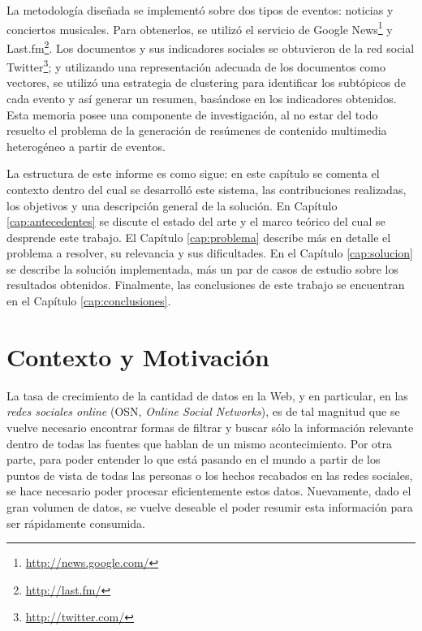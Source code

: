   La metodología diseñada se implementó sobre dos tipos de eventos:
  noticias y conciertos musicales. Para obtenerlos, se utilizó
  el servicio de Google News\footnote{\href{http://news.google.com/}{http://news.google.com/} } y
  Last.fm\footnote{\href{http://last.fm/}{http://last.fm/} }. Los documentos y sus indicadores
  sociales se obtuvieron de la red social
  Twitter\footnote{\href{http://twitter.com/}{http://twitter.com/} }; y utilizando una representación
  adecuada de los documentos como vectores, se utilizó una estrategia
  de clustering para identificar los subtópicos de cada evento y así
  generar un resumen, basándose en los indicadores obtenidos. Esta memoria posee una 
  componente de investigación, al no estar del todo resuelto el problema 
  de la generación de resúmenes de contenido multimedia heterogéneo a partir de eventos.

  La estructura de este informe es como sigue: en este capítulo se
  comenta el contexto dentro del cual se desarrolló este sistema, las
  contribuciones realizadas, los objetivos y una descripción general
  de la solución. En Capítulo \ref{cap:antecedentes} se discute el estado del
  arte y el marco teórico del cual se desprende este trabajo. El
  Capítulo \ref{cap:problema} describe más en detalle el problema a resolver, su
  relevancia y sus dificultades. En el
  Capítulo \ref{cap:solucion} se describe la solución implementada, más
  un par de casos de estudio sobre los resultados obtenidos. Finalmente, las conclusiones 
  de este trabajo se encuentran en el Capítulo \ref{cap:conclusiones}.

\section{Contexto y Motivación}
\label{sec-1.1}


   La tasa de crecimiento de la cantidad de datos en la Web, y en
   particular, en las \emph{redes sociales online} (OSN, \emph{Online Social Networks}),
   es de tal magnitud que se vuelve necesario encontrar formas de
   filtrar y buscar sólo la información relevante dentro de todas las
   fuentes que hablan de un mismo acontecimiento. Por otra parte, 
   para poder entender lo que está pasando en el mundo a partir de los 
   puntos de vista de todas las personas o los hechos recabados en las redes
   sociales, se hace necesario poder procesar eficientemente estos 
   datos. Nuevamente, dado el gran volumen de datos, se vuelve 
   deseable el poder resumir esta información para ser rápidamente
   consumida.

